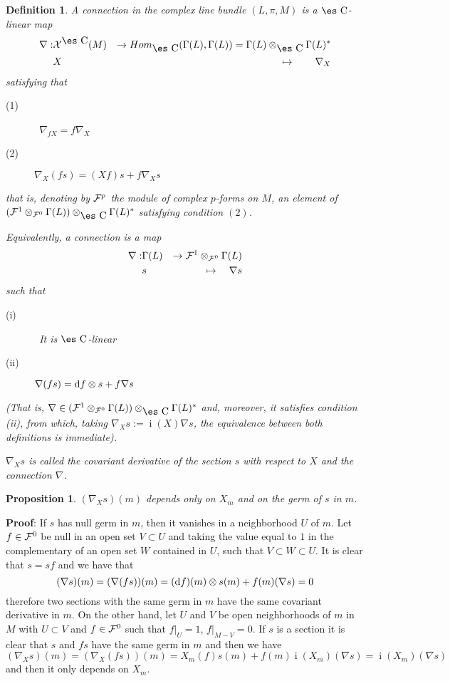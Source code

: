 \documentclass[12pt]{article}
\theoremstyle{plain}
\newtheorem{prop}{Proposition}
\newtheorem{definition}{Definition}
\def\beann{\begin{eqnarray*}}
\def\eeann{\end{eqnarray*}}
\def\qed{\ifvmode\removelastskip\fi
{\unskip\nobreak\hfil\penalty50\hbox{}\nobreak\hfil
\hbox{\vrule height1.2ex width1.2ex}\parfillskip=0pt
\finalhyphendemerits=0 \par\smallskip}}
\def\d{{\rm d}}
\def\Complex{\mbox{\es C}}
\def\inn{\mathop{i}\nolimits}
\begin{document}
\begin{definition}
A {\rm connection} in the complex line bundle
$(L,\pi ,M)$ is a $\Complex$-linear map
\beann
\nabla : & {\cal X}^{\Complex}(M) & \to
Hom_{\Complex}(\Gamma (L),\Gamma (L)) =
\Gamma (L) \otimes_{\Complex} \Gamma (L)^*
\\
& X & \mapsto \quad \quad \nabla_X
\eeann
satisfying that
\begin{description}
\item[{\rm (1)}] \
$\nabla_{fX} = f\nabla_X$
\item[{\rm (2)}]
$\nabla_X(fs) = (Xf)s + f\nabla_Xs$
\end{description}
that is, denoting by ${\cal F}^p$ the module of complex $p$-forms on
$M$,
an element of
$({\cal F}^1 \otimes_{{\cal F}^0} \Gamma (L))\otimes_{\Complex}\Gamma
(L)^*$
satisfying condition $(2)$.

Equivalently, a connection is a map
\beann
\nabla : & \Gamma(L) & \to
{\cal F}^1 \otimes_{{\cal F}^0} \Gamma (L)
\\
& s & \mapsto \quad \nabla s
\eeann
such that
\begin{description}
\item[{\rm (i)}] \
It is $\Complex$-linear
\item[{\rm (ii)}]
$\nabla (fs) = \d f \otimes s + f\nabla s$
\end{description}
(That is,
$\nabla \in ({\cal F}^1 \otimes_{{\cal F}^0} \Gamma (L))
\otimes_{\Complex} \Gamma (L)^*$
and, moreover, it satisfies condition (ii),
from which, taking
$\nabla_X s := \inn(X) \nabla s$,
the equivalence between both definitions
is immediate).

$\nabla_Xs$ is called the
{\rm covariant derivative}
of the section $s$ with respect to $X$
and the connection $\nabla$.
\label{nabla}
\end{definition}

\begin{prop}
$(\nabla_Xs)(m)$ depends only on $X_m$ and on the germ of $s$ in $m$.
\label{depen}
\end{prop}
{\bf Proof}:  If $s$ has null germ in $m$, then it vanishes
in a neighborhood $U$ of $m$. Let $f \in {\cal F}^0$ be null in an
open set $V \subset U$ and taking the value equal to $1$ in the
complementary of an open set $W$ contained in $U$, such that $V
\subset W \subset U$. It is clear that $s = sf$ and we have that
$$ (\nabla s)(m) = (\nabla (fs))(m) = (\d f)(m) \otimes s(m) +
f(m)(\nabla s) = 0 $$ therefore two sections with the same germ in
$m$ have the same covariant derivative in $m$. On the other hand,
let $U$ and $V$ be open neighborhoods of $m$ in $M$ with $U
\subset V$ and $f \in {\cal F}^0$ such that $f \vert_U = 1$, $f
\vert_{M-V} = 0$. If $s$ is a section it is clear that $s$ and
$fs$ have the same germ in $m$ and then we have $$ (\nabla_X s)(m)
= (\nabla_X (fs))(m) = X_m(f)s(m) + f(m)\inn(X_m)(\nabla s)
=\inn(X_m)(\nabla s) $$ and then it only depends on $X_m$. \qed
\end{document}
